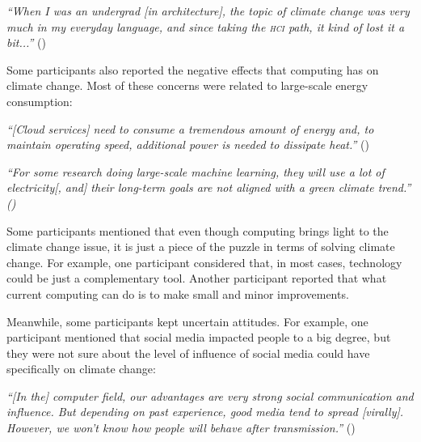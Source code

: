     \begin{quoting}
        \textit{
        ``When I was an undergrad [in architecture], the topic of climate change was very much in my everyday language, and since taking the \textsc{hci} path, it kind of lost it a bit...''        }()
    \end{quoting}
    
    Some participants also reported the negative effects that computing has on climate change. Most of these concerns were related to large-scale energy consumption:
    
    \begin{quoting}
        \textit{
        ``[Cloud services] need to consume a tremendous amount of energy and, to maintain operating speed, additional power is needed to dissipate heat.''
        } ()
    \end{quoting}
    
    \begin{quoting}
        \textit{
        ``For some research doing large-scale machine learning, they will use a lot of electricity[, and] their long-term goals are not aligned with a green climate trend.'' ()
        }
    \end{quoting}
    
    
    Some participants mentioned that even though computing brings light to the climate change issue, it is just a piece of the puzzle in terms of solving climate change. For example, one participant considered that, in most cases, technology could be just a complementary tool. Another participant reported that what current computing can do is to make small and minor improvements. %
    
    Meanwhile, some participants kept uncertain attitudes. For example, one participant mentioned that social media impacted people to a big degree, but they were not sure about the level of influence of social media could have specifically on climate change:
    
    \begin{quoting}
        \textit{
        ``[In the] computer field, our advantages are very strong social communication and influence. But depending on past experience, good media tend to spread [virally]. However, we won't know how people will behave after transmission.'' 
        }()
    \end{quoting}
    

